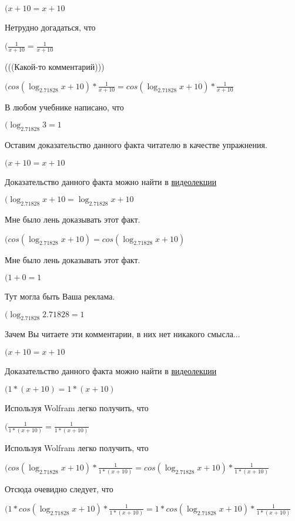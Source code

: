 \documentclass[12pt,a4paper,fleqn]{article}
\theoremstyle{definition}
\begin{document}
$( x  +  10  =  x  +  10 $

Нетрудно догадаться, что

$(\frac{ 1 }{ x  +  10 }
 = \frac{ 1 }{ x  +  10 }
$

(((Какой-то комментарий)))

$(cos(\log_{ 2.71828 }{ x  +  10 }) * \frac{ 1 }{ x  +  10 }
 = cos(\log_{ 2.71828 }{ x  +  10 }) * \frac{ 1 }{ x  +  10 }
$

В любом учебнике написано, что

$(\log_{ 2.71828 }{ 3 } =  1 $

Оставим доказательство данного факта читателю в качестве упражнения.

$( x  +  10  =  x  +  10 $

Доказательство данного факта можно найти в \href{https://www.youtube.com/watch?v=dQw4w9WgXcQ}{видеолекции}

$(\log_{ 2.71828 }{ x  +  10 } = \log_{ 2.71828 }{ x  +  10 }$

Мне было лень доказывать этот факт.

$(cos(\log_{ 2.71828 }{ x  +  10 }) = cos(\log_{ 2.71828 }{ x  +  10 })$

Мне было лень доказывать этот факт.

$( 1  +  0  =  1 $

Тут могла быть Ваша реклама.

$(\log_{ 2.71828 }{ 2.71828 } =  1 $

Зачем Вы читаете эти комментарии, в них нет никакого смысла...

$( x  +  10  =  x  +  10 $

Доказательство данного факта можно найти в \href{https://www.youtube.com/watch?v=dQw4w9WgXcQ}{видеолекции}

$( 1  * ( x  +  10 ) =  1  * ( x  +  10 )$

Используя Wolfram легко получить, что

$(\frac{ 1 }{ 1  * ( x  +  10 )}
 = \frac{ 1 }{ 1  * ( x  +  10 )}
$

Используя Wolfram легко получить, что

$(cos(\log_{ 2.71828 }{ x  +  10 }) * \frac{ 1 }{ 1  * ( x  +  10 )}
 = cos(\log_{ 2.71828 }{ x  +  10 }) * \frac{ 1 }{ 1  * ( x  +  10 )}
$

Отсюда очевидно следует, что

$( 1  * cos(\log_{ 2.71828 }{ x  +  10 }) * \frac{ 1 }{ 1  * ( x  +  10 )}
 =  1  * cos(\log_{ 2.71828 }{ x  +  10 }) * \frac{ 1 }{ 1  * ( x  +  10 )}
$
\end{document}
